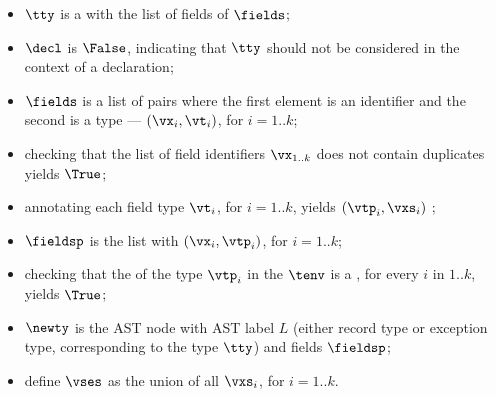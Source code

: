 \ProseParagraph
\AllApply
\begin{itemize}
  \item $\tty$ is a \collectiontypeterm{} with the list of fields of $\fields$;
  \item $\decl$ is $\False$, indicating that $\tty$ should not be considered in the context of a declaration;
  \item $\fields$ is a list of pairs where the first element is an identifier and the second is a type --- $(\vx_i, \vt_i)$, for $i=1..k$;
  \item checking that the list of field identifiers $\vx_{1..k}$ does not contain duplicates
  yields $\True$\ProseOrTypeError;
  \item annotating each field type $\vt_i$, for $i=1..k$, yields $(\vtp_i, \vxs_i)$
        \ProseOrTypeError;
  \item $\fieldsp$ is the list with $(\vx_i, \vtp_i)$, for $i=1..k$;
  \item checking that the \structureterm{} of the type $\vtp_i$ in the \staticenvironmentterm{} $\tenv$
        is a \bitvectortypeterm, for every $i$ in $1..k$, yields $\True$\ProseOrTypeError;
  \item $\newty$ is the AST node with AST label $L$ (either record type or exception type,
        corresponding to the type $\tty$) and fields $\fieldsp$;
  \item define $\vses$ as the union of all $\vxs_i$, for $i=1..k$.
\end{itemize}

\FormallyParagraph
\begin{mathpar}
\end{mathpar}


